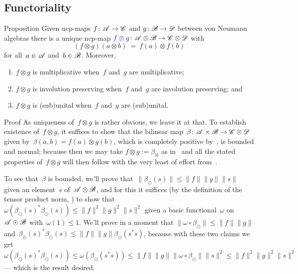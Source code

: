 \documentclass[a]{subfiles}
\begin{document}
\subsection{Functoriality}
\begin{parsec}%
\begin{point}{Proposition}%
Given ncp-maps $f\colon \mathscr{A}\to\mathscr{C}$
and $g\colon \mathscr{B}\to\mathscr{D}$
between von Neumann algebras
there is a unique ncp-map
$\Define{f\otimes g}\colon \scrA\otimes\scrB\to\scrC\otimes\scrD$
with 
\begin{equation*}
	(f\otimes g)(a\otimes b) \ =\ f(a)\otimes f(b)
\end{equation*}
for all~$a\in\mathscr{A}$ and~$b\in\mathscr{B}$.
Moreover,
\begin{enumerate}
\item
$f\otimes g$ is multiplicative 
when~$f$ and~$g$ are multiplicative;
\item
$f\otimes g$ is involution preserving
when~$f$ and~$g$ are involution preserving; and
\item
$f\otimes g$ is (sub)unital 
when~$f$ and~$g$ are (sub)unital.
\end{enumerate}
\begin{point}{Proof}%
As uniqueness of~$f\otimes g$ is rather obvious,
we leave it at that.
To establish
existence of~$f\otimes g$,
it suffices to show
that the bilinear map~$\beta\colon \mathscr{A}\times\mathscr{B}\to\mathscr{C}\otimes\mathscr{D}$
given by~$\beta(a,b)=f(a)\otimes g(b)$,
which is completely positive by~,
is bounded and normal;
because then we may take $f\otimes g:=\beta_\otimes$
as in~
and all
the stated properties of~$f\otimes g$ will then  follow 
with the very least of effort
from~.

To see that~$\beta$ is bounded,
we'll prove that~$\|\beta_\odot(s)\| \leq \|f\|\|g\| \|s\|$
given an element~$s$ of~$\mathscr{A}\otimes \mathscr{B}$,
and for this
it suffices (by the definition
of the tensor product norm, ) 
to show that
$\omega(\beta_\odot(s)^*\beta_\odot(s))
\leq \|f\|^2\|g\|^2\|s\|^2$
given a basic functional~$\omega$
on~$\mathscr{A}\odot\mathscr{B}$ with~$\omega(1)\leq 1$.
We'll prove in a moment that
$\|\omega\circ\beta_\odot\|\leq \|f\|\|g\|$
and~$\beta_\odot(s)^*\beta_\odot(s)\leq
\|f\|\|g\|\beta_\odot(s^*s)$,
because with these two claims
we get 
$\omega(\beta_\odot(s)^*\beta_\odot(s))
\leq \omega(\beta_\odot(s^*s))
\leq \|f\|\|g\| \|\omega\circ \beta_\odot\| \|s\|^2
\leq \|f\|^2\|g\|^2\|s\|^2$
 --- which is the result desired.


\end{point}
\end{point}
\end{parsec}
\end{document}
